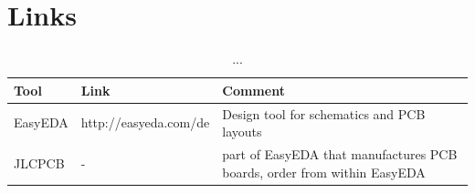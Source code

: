 \section{Links}

\begin{table}[!ht]
    \begin{center}
        \caption{...}
        \begin{tabular}{|l|l|p{}|}
            \toprule
            \textbf{Tool} & \textbf{Link} & \textbf{Comment} \\
            \midrule
            EasyEDA & http://easyeda.com/de & Design tool for schematics and PCB layouts \\
            \midrule
            JLCPCB & - & part of EasyEDA that manufactures PCB boards, order from within EasyEDA \\
            \bottomrule
        \end{tabular}
    \end{center}
\end{table}
